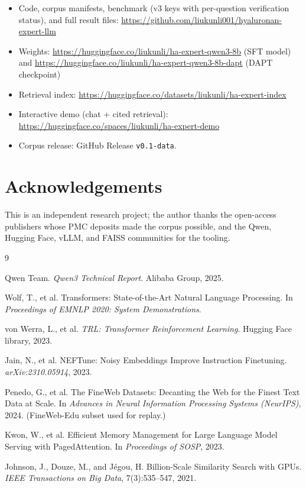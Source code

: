 \documentclass[11pt]{article}
\begin{document}
\begin{itemize}
\item Code, corpus manifests, benchmark (v3 keys with per-question
verification status), and full result files:
\url{https://github.com/liukunli001/hyaluronan-expert-llm}
\item Weights: \url{https://huggingface.co/liukunli/ha-expert-qwen3-8b}
(SFT model) and
\url{https://huggingface.co/liukunli/ha-expert-qwen3-8b-dapt} (DAPT
checkpoint)
\item Retrieval index:
\url{https://huggingface.co/datasets/liukunli/ha-expert-index}
\item Interactive demo (chat + cited retrieval):
\url{https://huggingface.co/spaces/liukunli/ha-expert-demo}
\item Corpus release: GitHub Release \texttt{v0.1-data}.
\end{itemize}

\section*{Acknowledgements}

This is an independent research project; the author thanks the open-access
publishers whose PMC deposits made the corpus possible, and the Qwen,
Hugging Face, vLLM, and FAISS communities for the tooling.

\begin{thebibliography}{9}

Qwen Team.
\newblock \emph{Qwen3 Technical Report}.
\newblock Alibaba Group, 2025.

Wolf, T., et al.
\newblock Transformers: State-of-the-Art Natural Language Processing.
\newblock In \emph{Proceedings of EMNLP 2020: System Demonstrations}.

von Werra, L., et al.
\newblock \emph{TRL: Transformer Reinforcement Learning}.
\newblock Hugging Face library, 2023.

Jain, N., et al.
\newblock NEFTune: Noisy Embeddings Improve Instruction Finetuning.
\newblock \emph{arXiv:2310.05914}, 2023.

Penedo, G., et al.
\newblock The FineWeb Datasets: Decanting the Web for the Finest Text Data
at Scale.
\newblock In \emph{Advances in Neural Information Processing Systems
(NeurIPS)}, 2024.
\newblock (FineWeb-Edu subset used for replay.)

Kwon, W., et al.
\newblock Efficient Memory Management for Large Language Model Serving
with PagedAttention.
\newblock In \emph{Proceedings of SOSP}, 2023.

Johnson, J., Douze, M., and J\'egou, H.
\newblock Billion-Scale Similarity Search with GPUs.
\newblock \emph{IEEE Transactions on Big Data}, 7(3):535--547, 2021.

\end{thebibliography}
\end{document}
